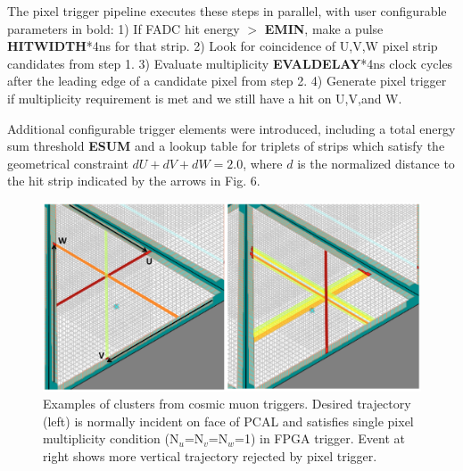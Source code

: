 The pixel trigger pipeline executes these steps in parallel, with user configurable parameters in bold:
  1) If FADC hit energy $>$ \textbf{EMIN}, make a pulse \textbf{HITWIDTH}*4ns for that strip.
  2) Look for coincidence of U,V,W pixel strip candidates from step 1.
  3) Evaluate multiplicity \textbf{EVALDELAY}*4ns clock cycles after the leading edge of a candidate pixel from step 2.
  4) Generate pixel trigger if multiplicity requirement is met and we still have a hit on U,V,and W. 

Additional configurable trigger elements were introduced, including a total energy sum threshold \textbf{ESUM} and a lookup table for triplets of strips which satisfy the geometrical constraint $dU+dV+dW=2.0$, where $d$ is the normalized distance to the hit strip indicated by the arrows in Fig. 6.

\begin{figure}[!htb]
 \centering
  \includegraphics[width=0.95\columnwidth,keepaspectratio]{img/TwoClusters.png}
 \caption{Examples of clusters from cosmic muon triggers.  Desired trajectory (left) is normally incident on face of PCAL and satisfies single pixel multiplicity condition (N$_u$=N$_v$=N$_w$=1) in FPGA trigger.  Event at right shows more vertical trajectory rejected by pixel trigger.}
\end{figure}

